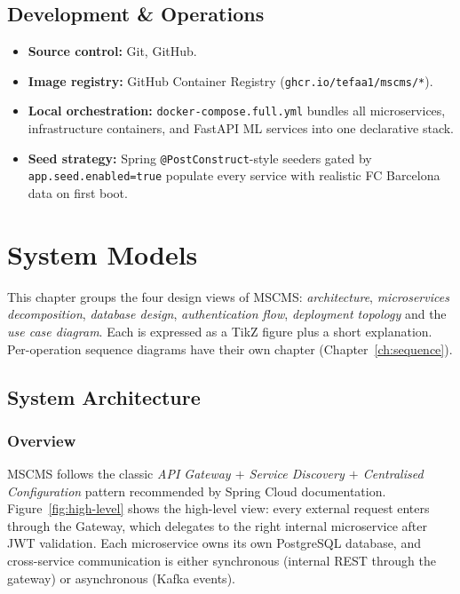 \documentclass[12pt,a4paper,oneside]{report}
\begin{document}
\section{Development \& Operations}
\begin{itemize}[leftmargin=*]
  \item \textbf{Source control:} Git, GitHub.
  \item \textbf{Image registry:} GitHub Container Registry
        (\texttt{ghcr.io/tefaa1/mscms/*}).
  \item \textbf{Local orchestration:} \texttt{docker-compose.full.yml}
        bundles all microservices, infrastructure containers,
        and FastAPI ML services into one declarative stack.
  \item \textbf{Seed strategy:} Spring \texttt{@PostConstruct}-style
        seeders gated by \texttt{app.seed.enabled=true} populate every
        service with realistic FC Barcelona data on first boot.
\end{itemize}
\fi

\chapter{System Models}
\label{ch:system-models}

This chapter groups the four design views of MSCMS:
\emph{architecture}, \emph{microservices decomposition},
\emph{database design}, \emph{authentication flow},
\emph{deployment topology} and the \emph{use case diagram}. Each is
expressed as a TikZ figure plus a short explanation. Per-operation
sequence diagrams have their own chapter (Chapter~\ref{ch:sequence}).

\section{System Architecture}
\label{sec:arch}

\subsection{Overview}
MSCMS follows the classic \emph{API Gateway $+$ Service Discovery $+$
Centralised Configuration} pattern recommended by Spring Cloud
documentation. Figure~\ref{fig:high-level} shows the high-level view: every
external request enters through the Gateway, which delegates to the right
internal microservice after JWT validation. Each microservice owns its own
PostgreSQL database, and cross-service communication is either synchronous
(internal REST through the gateway) or asynchronous (Kafka events).
\end{document}
